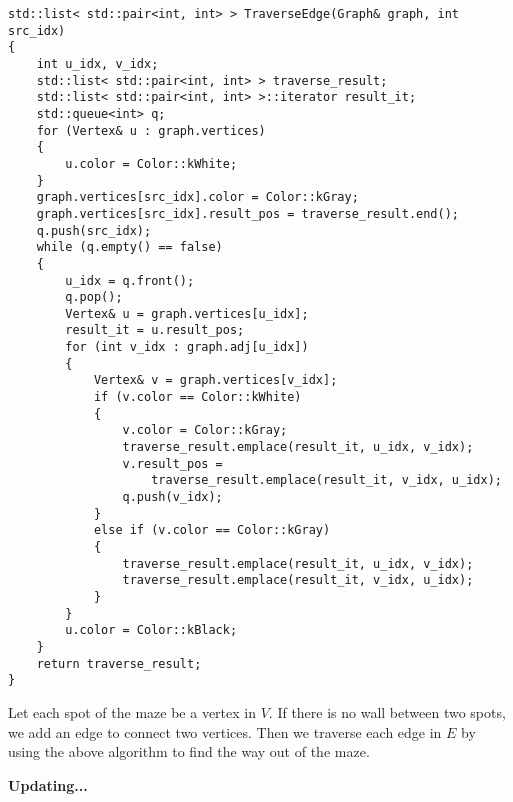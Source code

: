 \begin{verbatim}
std::list< std::pair<int, int> > TraverseEdge(Graph& graph, int src_idx)
{
    int u_idx, v_idx;
    std::list< std::pair<int, int> > traverse_result;
    std::list< std::pair<int, int> >::iterator result_it;
    std::queue<int> q;
    for (Vertex& u : graph.vertices)
    {
        u.color = Color::kWhite;
    }
    graph.vertices[src_idx].color = Color::kGray;
    graph.vertices[src_idx].result_pos = traverse_result.end();
    q.push(src_idx);
    while (q.empty() == false)
    {
        u_idx = q.front();
        q.pop();
        Vertex& u = graph.vertices[u_idx];
        result_it = u.result_pos;
        for (int v_idx : graph.adj[u_idx])
        {
            Vertex& v = graph.vertices[v_idx];
            if (v.color == Color::kWhite)
            {
                v.color = Color::kGray;
                traverse_result.emplace(result_it, u_idx, v_idx);
                v.result_pos = 
                    traverse_result.emplace(result_it, v_idx, u_idx);
                q.push(v_idx);
            }
            else if (v.color == Color::kGray)
            {
                traverse_result.emplace(result_it, u_idx, v_idx);
                traverse_result.emplace(result_it, v_idx, u_idx);
            }
        }
        u.color = Color::kBlack;
    }
    return traverse_result;
}
\end{verbatim}

Let each spot of the maze be a vertex in $V$.
If there is no wall between two spots, 
we add an edge to connect two vertices.
Then we traverse each edge in $E$ by using the above algorithm
to find the way out of the maze.

\centerline{\textbf{Updating...}}

